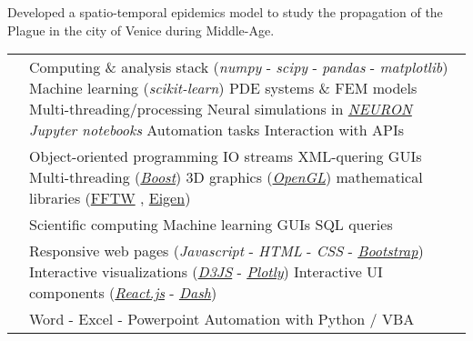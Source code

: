 \documentclass[a4paper]{cv}
\begin{document}
\begin{minipage}[t]{0.6\textwidth}
Developed a spatio-temporal epidemics model to study the propagation of the Plague in the city of Venice during Middle-Age.
\sectionspace

\techskills

\def\arraystretch{1.5}
\begin{tabular}{R{0.21\textwidth} L{0.7\textwidth}}

 & Computing \& analysis stack (\emph{numpy} - \emph{scipy} - \emph{pandas} - \emph{matplotlib}) \tbl{} Machine learning (\emph{scikit-learn}) \tbl{} PDE systems \& FEM models \tbl{} Multi-threading/processing \tbl{} Neural simulations in \href{https://neuron.yale.edu/neuron/}{\emph{NEURON}} \tbl{} \emph{Jupyter notebooks} \tbl{} Automation tasks \tbl{}Interaction with APIs\\

 & Object-oriented programming \tbl{} IO streams \tbl{} XML-quering \tbl{} GUIs \tbl{} Multi-threading (\href{https://www.boost.org/}{\emph{Boost}}) \tbl{} 3D graphics (\href{https://www.opengl.org/}{\emph{OpenGL}}) \tbl{} mathematical libraries (\href{http://fftw.org/}{FFTW} , \href{http://eigen.tuxfamily.org/index.php?title=Main_Page}{Eigen})\\

 & Scientific computing \tbl{} Machine learning \tbl{} GUIs \tbl{} SQL queries\\

 & Responsive web pages (\emph{Javascript} - \emph{HTML} - \emph{CSS} - \href{http://getbootstrap.com/}{\emph{Bootstrap}}) \tbl{} Interactive visualizations (\href{https://d3js.org}{\emph{D3JS}} - \href{https://plot.ly/}{\emph{Plotly}}) \tbl{} Interactive UI components (\href{https://reactjs.org}{\emph{React.js}} - \href{https://dash.plot.ly/}{\emph{Dash}}) \\

 & Word - Excel - Powerpoint \tbl{} Automation with Python / VBA\\

\end{tabular}

\vspace{5pt}
\otherskills

\end{minipage}
\end{document}

